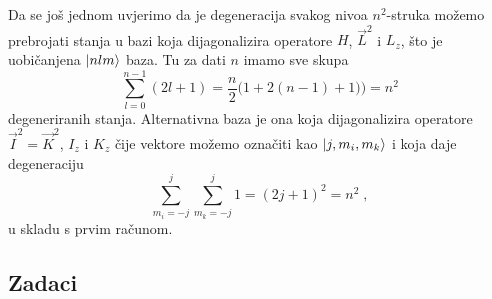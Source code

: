 Da se još jednom uvjerimo da je degeneracija
svakog nivoa $n^2$-struka  možemo prebrojati stanja u bazi koja
dijagonalizira operatore $H$, $\vec{L}^2$ i $L_z$, što je
uobičanjena $| nlm \rangle$ baza. Tu za dati $n$ imamo sve skupa
\begin{equation}
 \sum_{l=0}^{n-1} (2l+1) =\frac{n}{2}\big(1+2(n-1)+1)\big) = n^2
\end{equation}
degeneriranih stanja.
Alternativna baza je ona koja dijagonalizira operatore
$\vec{I}^2=\vec{K}^2$, $I_z$ i $K_z$ čije vektore možemo
označiti kao $| j,m_i, m_k \rangle$ i koja daje degeneraciju
\begin{equation}
    \sum_{m_i=-j}^{j}\sum_{m_k=-j}^{j} 1 = (2j+1)^2 = n^2 \;,
\end{equation}
u skladu s prvim računom.


\subsection*{Zadaci}

